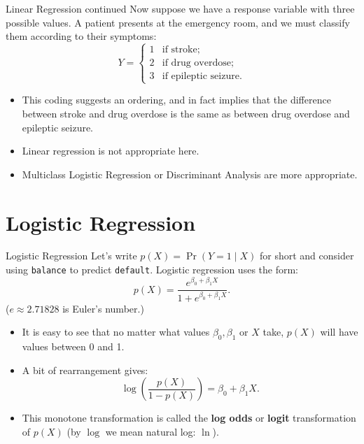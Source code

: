 \documentclass[aspectratio=169, 11pt]{beamer}
\begin{document}
\begin{frame}{Linear Regression continued}
  Now suppose we have a response variable with three possible values. A patient presents at the emergency room, and we must classify them according to their symptoms:
  \[
    Y = \begin{cases}
      1 & \text{if stroke;} \\
      2 & \text{if drug overdose;} \\
      3 & \text{if epileptic seizure.}
    \end{cases}
  \]
  \begin{itemize}
    \item This coding suggests an ordering, and in fact implies that the difference between stroke and drug overdose is the same as between drug overdose and epileptic seizure.
    \item Linear regression is not appropriate here.
    \item Multiclass Logistic Regression or Discriminant Analysis are more appropriate.
  \end{itemize}
\end{frame}

\section{Logistic Regression}

\begin{frame}{Logistic Regression}
  Let's write $p(X) = \Pr(Y = 1 \mid X)$ for short and consider using \texttt{balance} to predict \texttt{default}. Logistic regression uses the form:
  \[
    p(X) = \frac{e^{\beta_0 + \beta_1 X}}{1 + e^{\beta_0 + \beta_1 X}}.
  \]
  ($e \approx 2.71828$ is Euler's number.)
  \begin{itemize}
    \item It is easy to see that no matter what values $\beta_0, \beta_1$ or $X$ take, $p(X)$ will have values between 0 and 1.
    \item A bit of rearrangement gives:
    \[
      \log\left(\frac{p(X)}{1 - p(X)}\right) = \beta_0 + \beta_1 X.
    \]
    \item This monotone transformation is called the \textbf{log odds} or \textbf{logit} transformation of $p(X)$ (by $\log$ we mean natural log: $\ln$).
  \end{itemize}
\end{frame}
\end{document}
